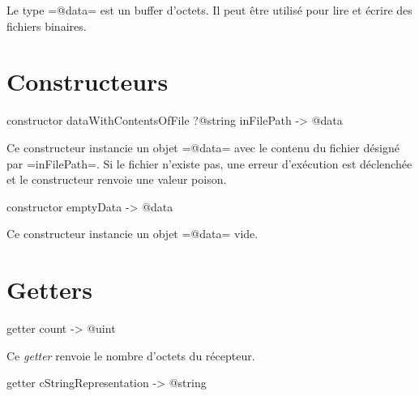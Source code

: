 



Le type \ggst=@data= est un buffer d'octets. Il peut être utilisé pour lire et écrire des fichiers binaires.




\section{Constructeurs}



\begin{galgas3}
constructor dataWithContentsOfFile ?@string inFilePath -> @data
\end{galgas3}

Ce constructeur instancie un objet \ggst=@data= avec le contenu du fichier désigné par \ggst=inFilePath=. Si le fichier n'existe pas, une erreur d'exécution est déclenchée et le constructeur renvoie une valeur poison.





\begin{galgas3}
constructor emptyData -> @data
\end{galgas3}

Ce constructeur instancie un objet \ggst=@data= vide.








\section{Getters}




\begin{galgas3}
getter count -> @uint
\end{galgas3}

Ce \emph{getter} renvoie le nombre d'octets du récepteur.



\begin{galgas3}
getter cStringRepresentation -> @string
\end{galgas3}

